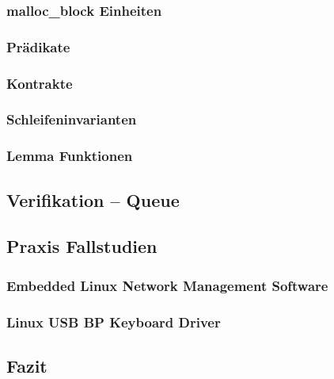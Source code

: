 \subsubsection{malloc\_block Einheiten}

\subsubsection{Prädikate}

\subsubsection{Kontrakte}

\subsubsection{Schleifeninvarianten}

\subsubsection{Lemma Funktionen}

\subsection{Verifikation -- Queue}
\label{subsec:queue}

\subsection{Praxis Fallstudien}

\subsubsection{Embedded Linux Network Management Software}

\subsubsection{Linux USB BP Keyboard Driver}

\subsection{Fazit}